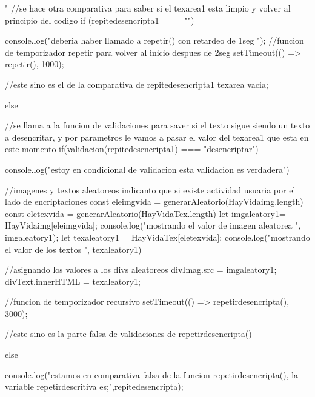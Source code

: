                    
                        " //se hace otra comparativa para saber si el texarea1 esta limpio y volver al principio del codigo
                        if (repitedesencripta1 === "") {
                        console.log("deberia haber llamado a repetir() con retardeo de 1seg ");
                        //funcion de temporizador repetir para volver al inicio despues de 2seg
                        setTimeout(() => repetir(), 1000);

                        //este sino es el de la comparativa de repitedesencripta1 texarea vacia;
                        }else{ 

                            //se llama a la funcion de validaciones para saver si el texto sigue siendo un texto a desencritar, y por parametros le vamos a pasar el valor del texarea1 que esta en este momento
                            if(validacion(repitedesencripta1) === "desencriptar"){
                                console.log("estoy en condicional de validacion esta validacion es verdadera")

                                //imagenes y textos aleatoreos indicanto que si existe actividad usuaria por el lado de encriptaciones 
                                const eleimgvida = generarAleatorio(HayVidaimg.length)
                                const eletexvida = generarAleatorio(HayVidaTex.length)
                                let imgaleatory1= HayVidaimg[eleimgvida];
                                console.log("mostrando el valor de imagen aleatorea ", imgaleatory1);
                                let texaleatory1 = HayVidaTex[eletexvida];
                                console.log("mostrando el valor de los textos ", texaleatory1)

                                //asignando los valores a los divs aleatoreos
                                divImag.src = imgaleatory1;
                                divText.innerHTML = texaleatory1;
                        
                                //funcion de temporizador recursivo
                                setTimeout(() => repetirdesencripta(), 3000);

                                //este sino es la parte falsa de validaciones de repetirdesencripta()
                            } else{
                                console.log("estamos en comparativa falsa de la funcion  repetirdesencripta(), la variable repetirdescritiva es;",repitedesencripta);
                                
}}
